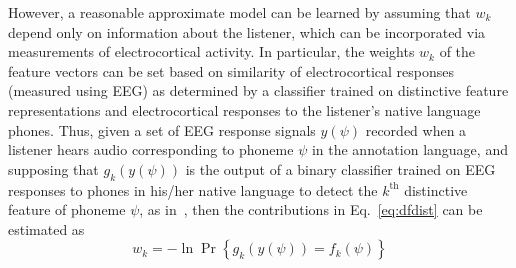 However, a reasonable approximate model can be learned by assuming that
$w_k$ depend only on information about the listener, which can be
incorporated via measurements of electrocortical activity. In particular,
the weights $w_k$ of the feature vectors can be set based on similarity
of electrocortical responses (measured using EEG) as determined by a
classifier trained on distinctive feature representations and
electrocortical responses to the listener's native language phones. Thus,
given a set of EEG response signals $y(\psi)$ recorded when a listener
hears audio corresponding to phoneme $\psi$ in the annotation
language, and supposing that $g_k(y(\psi))$ is the output of a binary
classifier trained on EEG responses to phones in his/her native language 
to detect the $k^{\textrm{th}}$ distinctive feature of phoneme $\psi$, 
as in~\cite{Liberto15}, then the contributions in Eq.~\ref{eq:dfdist} can be 
estimated as
\begin{equation}
  w_k = -\ln\Pr\left\{g_k(y(\psi))= f_k(\psi)\right\}
  \label{eq:eegdist}
\end{equation}
